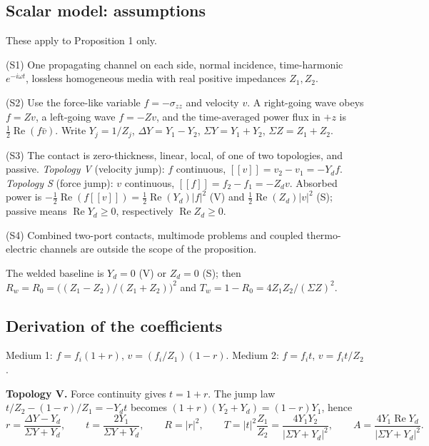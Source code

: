 \documentclass[11pt]{article}
\newcommand{\jj}{[\![}
\newcommand{\kk}{]\!]}
\begin{document}
\subsection{Scalar model: assumptions}

These apply to Proposition 1 only.

\noindent (S1) One propagating channel on each side, normal incidence,
time-harmonic $e^{-i\omega t}$, lossless homogeneous media with real positive
impedances $Z_1, Z_2$.

\noindent (S2) Use the force-like variable $f=-\sigma_{zz}$ and velocity $v$. A
right-going wave obeys $f=Zv$, a left-going wave $f=-Zv$, and the time-averaged
power flux in $+z$ is $\tfrac12\operatorname{Re}(f\bar v)$. Write $Y_j=1/Z_j$,
$\Delta Y=Y_1-Y_2$, $\Sigma Y=Y_1+Y_2$, $\Sigma Z=Z_1+Z_2$.

\noindent (S3) The contact is zero-thickness, linear, local, of one of two
topologies, and passive. \emph{Topology V} (velocity jump): $f$ continuous,
$\jj v\kk = v_2-v_1 = -Y_d f$. \emph{Topology S} (force jump): $v$ continuous,
$\jj f\kk = f_2-f_1 = -Z_d v$. Absorbed power is
$-\tfrac12\operatorname{Re}(f\jj v\kk) = \tfrac12\operatorname{Re}(Y_d)\lvert f\rvert^2$
(V) and $\tfrac12\operatorname{Re}(Z_d)\lvert v\rvert^2$ (S); passive means
$\operatorname{Re}Y_d\ge0$, respectively $\operatorname{Re}Z_d\ge0$.

\noindent (S4) Combined two-port contacts, multimode problems and coupled
thermo-electric channels are outside the scope of the proposition.

The welded baseline is $Y_d=0$ (V) or $Z_d=0$ (S); then
$R_w = R_0 = \big((Z_1-Z_2)/(Z_1+Z_2)\big)^2$ and
$T_w = 1-R_0 = 4Z_1Z_2/(\Sigma Z)^2$.

\subsection{Derivation of the coefficients}

Medium 1: $f=f_i(1+r)$, $v=(f_i/Z_1)(1-r)$. Medium 2: $f=f_i t$, $v=f_i t/Z_2$.

\textbf{Topology V.} Force continuity gives $t=1+r$. The jump law
$t/Z_2 - (1-r)/Z_1 = -Y_d t$ becomes $(1+r)(Y_2+Y_d)=(1-r)Y_1$, hence
\begin{equation}
  r = \frac{\Delta Y - Y_d}{\Sigma Y + Y_d}, \qquad
  t = \frac{2Y_1}{\Sigma Y + Y_d}, \qquad
  R = \lvert r\rvert^2, \qquad
  T = \lvert t\rvert^2\frac{Z_1}{Z_2} = \frac{4Y_1Y_2}{\lvert\Sigma Y+Y_d\rvert^2},
  \qquad
  A = \frac{4Y_1\operatorname{Re}Y_d}{\lvert\Sigma Y+Y_d\rvert^2}. \tag{9}
\end{equation}
\end{document}
